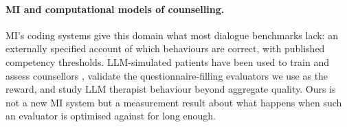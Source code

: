 \paragraph{MI and computational models of counselling.} MI's coding systems
\citep{moyers2016miti} give this domain what most dialogue benchmarks lack: an externally
specified account of which behaviours are correct, with published competency thresholds.
LLM-simulated patients have been used to train and assess counsellors
\citep{steenstra2024scaffolding}, \citet{yosef2024assessing} validate the questionnaire-filling
evaluators we use as the reward, and \citet{chen2025broaden} study LLM therapist behaviour
beyond aggregate quality. Ours is not a new MI system but a measurement result about what
happens when such an evaluator is optimised against for long enough.
